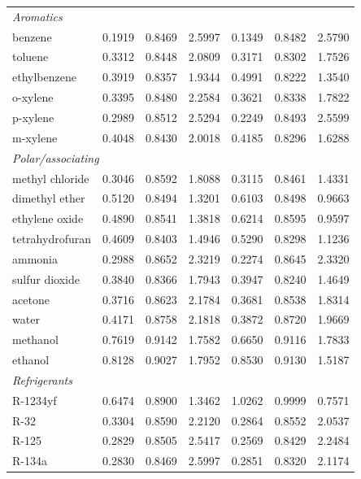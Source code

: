 \begin{table}[H]
\begin{tabular}{lcccccc}
\multicolumn{7}{l}{\emph{Aromatics}} \\
benzene & 0.1919 & 0.8469 & 2.5997 & 0.1349 & 0.8482 & 2.5790 \\
toluene & 0.3312 & 0.8448 & 2.0809 & 0.3171 & 0.8302 & 1.7526 \\
ethylbenzene & 0.3919 & 0.8357 & 1.9344 & 0.4991 & 0.8222 & 1.3540 \\
o-xylene & 0.3395 & 0.8480 & 2.2584 & 0.3621 & 0.8338 & 1.7822 \\
p-xylene & 0.2989 & 0.8512 & 2.5294 & 0.2249 & 0.8493 & 2.5599 \\
m-xylene & 0.4048 & 0.8430 & 2.0018 & 0.4185 & 0.8296 & 1.6288 \\
\multicolumn{7}{l}{\emph{Polar/associating}} \\
methyl chloride & 0.3046 & 0.8592 & 1.8088 & 0.3115 & 0.8461 & 1.4331 \\
dimethyl ether & 0.5120 & 0.8494 & 1.3201 & 0.6103 & 0.8498 & 0.9663 \\
ethylene oxide & 0.4890 & 0.8541 & 1.3818 & 0.6214 & 0.8595 & 0.9597 \\
tetrahydrofuran & 0.4609 & 0.8403 & 1.4946 & 0.5290 & 0.8298 & 1.1236 \\
ammonia & 0.2988 & 0.8652 & 2.3219 & 0.2274 & 0.8645 & 2.3320 \\
sulfur dioxide & 0.3840 & 0.8366 & 1.7943 & 0.3947 & 0.8240 & 1.4649 \\
acetone & 0.3716 & 0.8623 & 2.1784 & 0.3681 & 0.8538 & 1.8314 \\
water & 0.4171 & 0.8758 & 2.1818 & 0.3872 & 0.8720 & 1.9669 \\
methanol & 0.7619 & 0.9142 & 1.7582 & 0.6650 & 0.9116 & 1.7833 \\
ethanol & 0.8128 & 0.9027 & 1.7952 & 0.8530 & 0.9130 & 1.5187 \\
\multicolumn{7}{l}{\emph{Refrigerants}} \\
R-1234yf & 0.6474 & 0.8900 & 1.3462 & 1.0262 & 0.9999 & 0.7571 \\
R-32 & 0.3304 & 0.8590 & 2.2120 & 0.2864 & 0.8552 & 2.0537 \\
R-125 & 0.2829 & 0.8505 & 2.5417 & 0.2569 & 0.8429 & 2.2484 \\
R-134a & 0.2830 & 0.8469 & 2.5997 & 0.2851 & 0.8320 & 2.1174 \\
\bottomrule
\end{tabular}
\end{table}
